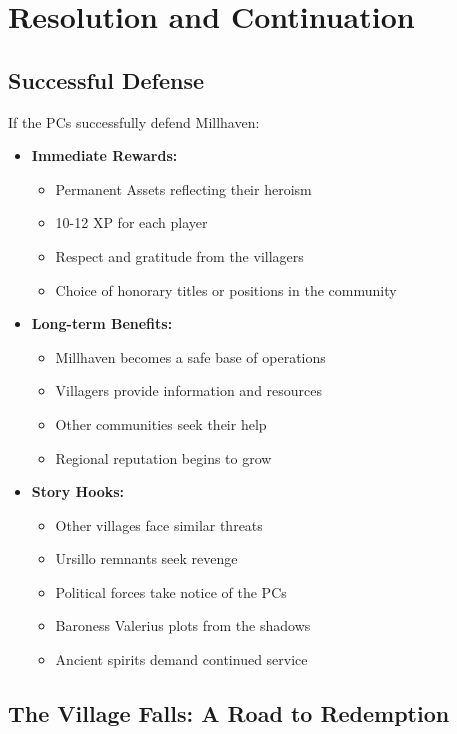 \documentclass[11pt]{article}
\begin{document}
\section{Resolution and Continuation}

\subsection{Successful Defense}

If the PCs successfully defend Millhaven:
\begin{itemize}
\item \textbf{Immediate Rewards:}
   \begin{itemize}
   \item Permanent Assets reflecting their heroism
   \item 10-12 XP for each player
   \item Respect and gratitude from the villagers
   \item Choice of honorary titles or positions in the community
   \end{itemize}
\item \textbf{Long-term Benefits:}
   \begin{itemize}
   \item Millhaven becomes a safe base of operations
   \item Villagers provide information and resources
   \item Other communities seek their help
   \item Regional reputation begins to grow
   \end{itemize}
\item \textbf{Story Hooks:}
   \begin{itemize}
   \item Other villages face similar threats
   \item Ursillo remnants seek revenge
   \item Political forces take notice of the PCs
   \item Baroness Valerius plots from the shadows
   \item Ancient spirits demand continued service
   \end{itemize}
\end{itemize}

\subsection{The Village Falls: A Road to Redemption}
\end{document}
